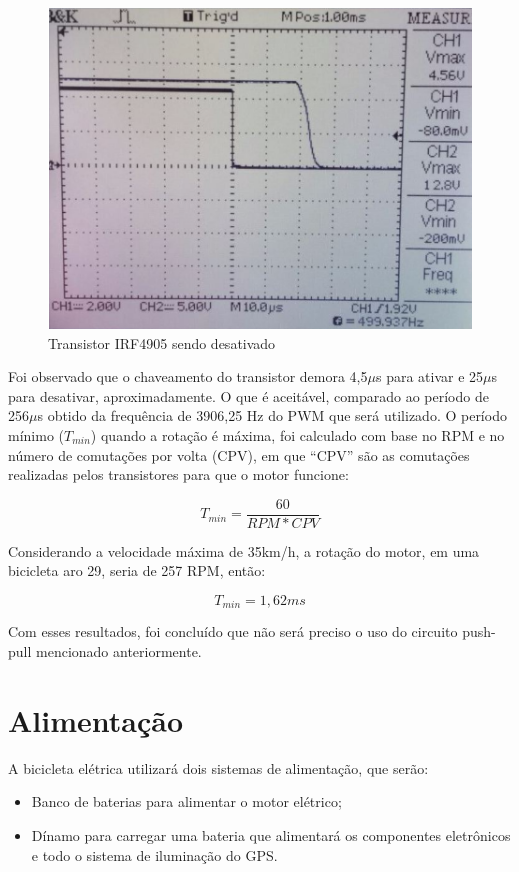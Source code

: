 	\newpage
	
	\begin{figure}[!htp]
		\centering
		\includegraphics[scale=0.60]{transistor_sendo_ativado_4.png}
		\caption{Transistor IRF4905 sendo desativado}
		\label{img:Transistor IRF4905 sendo desativado}
	\end{figure}
	
	Foi observado que o chaveamento do transistor demora 4,5$\mu$s para ativar e 25$\mu$s para desativar, aproximadamente. O que é aceitável, comparado ao período de 256$\mu$s obtido da frequência de 3906,25 Hz do PWM que será utilizado. O período mínimo ($T_{min}$) quando a rotação é máxima, foi calculado com base no RPM e no número de comutações por volta (CPV), em que “CPV” são as comutações realizadas pelos transistores para que o motor funcione:
	
	\begin{equation}
	T_{min} = \frac{60}{RPM * CPV}
	\end{equation}
	
	Considerando a velocidade máxima de 35km/h, a rotação do motor, em uma bicicleta aro 29, seria de 257 RPM, então:
	
	\begin{equation}
	T_{min} = 1,62ms
	\end{equation}
	
	Com esses resultados, foi concluído que não será preciso o uso do circuito push-pull mencionado anteriormente.
	
	
  \section{Alimentação}
  A bicicleta elétrica utilizará dois sistemas de alimentação, que serão:
  \begin{itemize}
  	\item Banco de baterias para alimentar o motor elétrico;
  	\item Dínamo para carregar uma bateria que alimentará os componentes eletrônicos e todo o sistema de iluminação do GPS. 
  \end{itemize}
  
